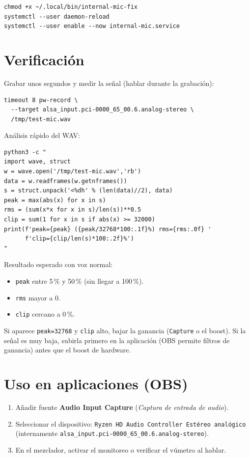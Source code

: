 \documentclass[12pt,a4paper]{article}
\begin{document}
\begin{lstlisting}[style=bash]
chmod +x ~/.local/bin/internal-mic-fix
systemctl --user daemon-reload
systemctl --user enable --now internal-mic.service
\end{lstlisting}

\section{Verificación}

Grabar unos segundos y medir la señal (hablar durante la grabación):

\begin{lstlisting}[style=bash]
timeout 8 pw-record \
  --target alsa_input.pci-0000_65_00.6.analog-stereo \
  /tmp/test-mic.wav
\end{lstlisting}

Análisis rápido del WAV:

\begin{lstlisting}[style=bash]
python3 -c "
import wave, struct
w = wave.open('/tmp/test-mic.wav','rb')
data = w.readframes(w.getnframes())
s = struct.unpack('<%dh' % (len(data)//2), data)
peak = max(abs(x) for x in s)
rms = (sum(x*x for x in s)/len(s))**0.5
clip = sum(1 for x in s if abs(x) >= 32000)
print(f'peak={peak} ({peak/32768*100:.1f}%) rms={rms:.0f} '
      f'clip={clip/len(s)*100:.2f}%')
"
\end{lstlisting}

Resultado esperado con voz normal:

\begin{itemize}
  \item \texttt{peak} entre 5\,\% y 50\,\% (sin llegar a 100\,\%).
  \item \texttt{rms} mayor a 0.
  \item \texttt{clip} cercano a 0\,\%.
\end{itemize}

Si aparece \texttt{peak=32768} y \texttt{clip} alto, bajar la ganancia
(\texttt{Capture} o el boost). Si la señal es muy baja, subirla primero en la
aplicación (OBS permite filtros de ganancia) antes que el boost de hardware.

\section{Uso en aplicaciones (OBS)}

\begin{enumerate}
  \item Añadir fuente \textbf{Audio Input Capture} (\emph{Captura de entrada
        de audio}).
  \item Seleccionar el dispositivo:
        \texttt{Ryzen HD Audio Controller Estéreo analógico}
        (internamente \texttt{alsa\_input.pci-0000\_65\_00.6.analog-stereo}).
  \item En el mezclador, activar el monitoreo o verificar el vúmetro al
        hablar.
\end{enumerate}
\end{document}
